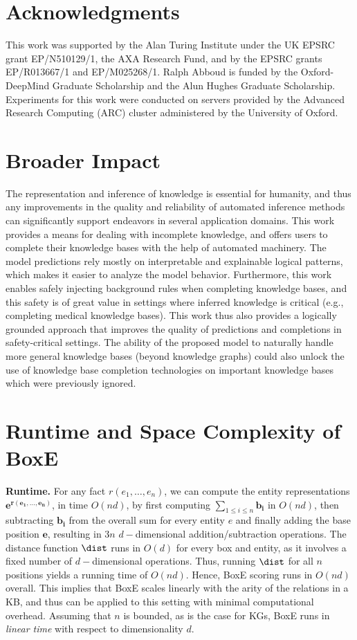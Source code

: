 \documentclass{article}
\begin{document}
\section*{Acknowledgments}
This work was supported by the Alan Turing Institute under the UK EPSRC grant EP/N510129/1, the AXA Research Fund, and by the EPSRC grants EP/R013667/1 and EP/M025268/1. Ralph Abboud is funded by the Oxford-DeepMind Graduate Scholarship and the Alun Hughes Graduate Scholarship. Experiments for this work were conducted on servers provided by the Advanced Research Computing (ARC) cluster administered by the University of Oxford. 


\section*{Broader Impact}
The representation and inference of knowledge is essential for humanity, and thus any improvements in the quality and reliability of automated inference methods can significantly support endeavors in several application domains. 
This work provides a means for dealing with incomplete knowledge, and offers users to complete their knowledge bases with the help of automated machinery. The model predictions rely mostly on interpretable and explainable logical patterns, which makes it easier to analyze the model behavior.
Furthermore, this work enables safely injecting background rules when completing knowledge bases, and this safety is of great value in settings where inferred knowledge is critical (e.g., completing medical knowledge bases). This work thus also provides a logically grounded approach that improves the quality of predictions and completions in safety-critical settings. The ability of the proposed model to naturally handle more general knowledge bases (beyond knowledge graphs) could also unlock the use of knowledge base completion technologies on important knowledge bases which were previously ignored.




\clearpage{}\appendix
\section{Runtime and Space Complexity of BoxE}
\label{app:complexity}
\textbf{Runtime.} 
For any fact $r(e_1, \ldots, e_n)$, we can compute the entity representations $\bm{e^{r(e_1, \ldots, e_n)}}$,  in time $O(nd)$, by first computing $\sum_{1 \leq  i \leq n} \bm{b_{i}}$ in $O(nd)$, then subtracting $\bm{b_i}$ from the overall sum for every entity $e$ and finally adding the base position $\bm{e}$, resulting in $3n$ $d-$dimensional addition/subtraction operations. The distance function $\dist$ runs in $O(d)$ for every box and entity, as it involves a fixed number of $d-$dimensional operations. Thus, running $\dist$ for all $n$ positions yields a running time of $O(nd)$. Hence, BoxE scoring runs in $O(nd)$ overall. This implies that BoxE scales linearly with the arity of the relations in a KB, and thus can be applied to this setting with minimal computational overhead. Assuming that $n$ is bounded, as is the case for KGs, BoxE runs in \emph{linear time} with respect to dimensionality $d$.
\end{document}
